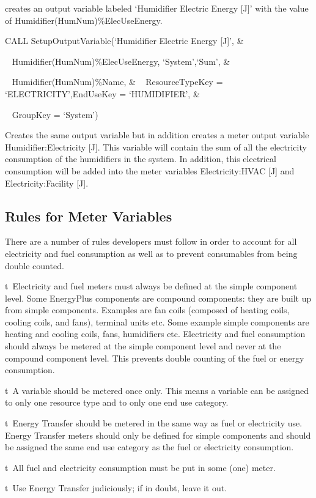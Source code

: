creates an output variable labeled `Humidifier Electric Energy {[}J{]}' with the value of Humidifier(HumNum)\%ElecUseEnergy.

CALL SetupOutputVariable(`Humidifier Electric Energy {[}J{]}', \&

~ Humidifier(HumNum)\%ElecUseEnergy, `System',`Sum', \&

~ Humidifier(HumNum)\%Name, \& ~ ResourceTypeKey = `ELECTRICITY',EndUseKey = `HUMIDIFIER', \&

~ GroupKey = `System')

Creates the same output variable but in addition creates a meter output variable Humidifier:Electricity {[}J{]}. This variable will contain the sum of all the electricity consumption of the humidifiers in the system. In addition, this electrical consumption will be added into the meter variables Electricity:HVAC {[}J{]} and Electricity:Facility {[}J{]}.

\subsection{Rules for Meter Variables}\label{rules-for-meter-variables}

There are a number of rules developers must follow in order to account for all electricity and fuel consumption as well as to prevent consumables from being double counted.

t~Electricity and fuel meters must always be defined at the simple component level. Some EnergyPlus components are compound components: they are built up from simple components. Examples are fan coils (composed of heating coils, cooling coils, and fans), terminal units etc. Some example simple components are heating and cooling coils, fans, humidifiers etc. Electricity and fuel consumption should always be metered at the simple component level and never at the compound component level. This prevents double counting of the fuel or energy consumption.

t~A variable should be metered once only. This means a variable can be assigned to only one resource type and to only one end use category.

t~Energy Transfer should be metered in the same way as fuel or electricity use. Energy Transfer meters should only be defined for simple components and should be assigned the same end use category as the fuel or electricity consumption.

t~All fuel and electricity consumption must be put in some (one) meter.

t~Use Energy Transfer judiciously; if in doubt, leave it out.
